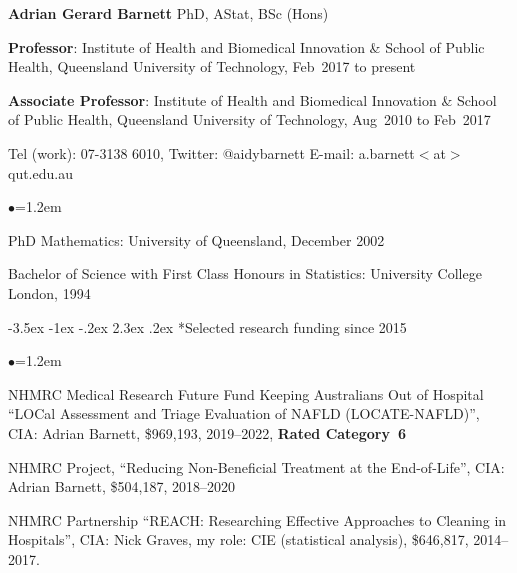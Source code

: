 \documentclass[a4paper,11pt]{article}
\makeatletter
\renewcommand\section{\@startsection {section}{1}{\z@}%
                                   {-3.5ex \@plus -1ex \@minus -.2ex}%
                                   {2.3ex \@plus.2ex}%
                                   {\normalfont\large\bfseries\color{blue}}}
\renewcommand{\labelitemi}{$\bullet$}
\makeatother
\begin{document}
\begin{raggedright}


\begin{center}
\textbf{Adrian Gerard Barnett} PhD, AStat, BSc (Hons)
\end{center}

\textbf{Professor}: Institute of Health and Biomedical Innovation \& School of Public Health, Queensland University of Technology, Feb~2017 to present

\textbf{Associate Professor}: Institute of Health and Biomedical Innovation \& School of Public Health, Queensland University of Technology, Aug~2010 to Feb~2017

Tel (work): 07-3138 6010, Twitter: @aidybarnett
E-mail: a.barnett$<$at$>$qut.edu.au

\begin{list}{\labelitemi}{\leftmargin=1.2em}\addtolength{\itemsep}{-0.5\baselineskip}
\item PhD Mathematics: University of Queensland, December 2002
\item Bachelor of Science with First Class Honours in Statistics: University College London, 1994
\end{list}

\label{papersstart}
\label{papersstop}

\section*{Selected research funding since 2015}

\begin{list}{\labelitemi}{\leftmargin=1.2em}\addtolength{\itemsep}{-0.5\baselineskip}

\item NHMRC Medical Research Future Fund Keeping Australians Out of Hospital ``LOCal Assessment and Triage Evaluation of NAFLD (LOCATE-NAFLD)'', CIA: Adrian Barnett, \$969,193, 2019--2022, \textbf{Rated Category~6}

\item NHMRC Project, ``Reducing Non-Beneficial Treatment at the End-of-Life'', CIA: Adrian Barnett, \$504,187, 2018--2020

\item NHMRC Partnership ``REACH: Researching Effective Approaches to Cleaning in Hospitals'', CIA: Nick Graves, my role: CIE (statistical analysis), \$646,817, 2014--2017.


\end{list}
\end{raggedright}
\end{document}
